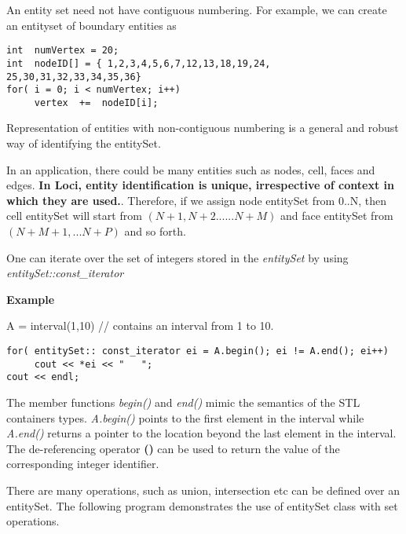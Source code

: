 An entity set need not have contiguous numbering. For example, we can create an entityset
of boundary entities as

\begin{verbatim}
int  numVertex = 20;
int  nodeID[] = { 1,2,3,4,5,6,7,12,13,18,19,24, 25,30,31,32,33,34,35,36}
for( i = 0; i < numVertex; i++)
     vertex  +=  nodeID[i];
\end{verbatim}

Representation of entities with non-contiguous numbering is a general and robust 
way of identifying the entitySet.

\par In an application, there could be many entities such as nodes, cell, 
faces and edges.  {\bf In Loci, entity identification is unique, irrespective
of context in which they are used.}. Therefore, if we assign node entitySet from 0..N,
then cell entitySet will start from $(N+1, N+2......N+M)$ and face entitySet from $(N+M+1,...N+P)$
and so forth.

\par One can iterate over the set of integers stored in the {\em entitySet} by 
using {\em entitySet::const\_iterator}
\par {\bf Example}
\par A = interval(1,10)       // contains an interval from 1 to 10.
\begin{verbatim}
for( entitySet:: const_iterator ei = A.begin(); ei != A.end(); ei++)
     cout << *ei << "   ";
cout << endl;
\end{verbatim}
The member functions {\em begin()} and {\em end()} mimic the semantics of the STL
containers types. {\em A.begin()} points to the first element in the interval while
{\em A.end()} returns a pointer to the location beyond the last element in the 
interval. The de-referencing operator {\bf *()} can be used to return the value of 
the corresponding integer identifier. 

\par There are many operations, such as union, intersection etc can be defined 
over an entitySet. The following program demonstrates the use of entitySet class 
with set operations.

